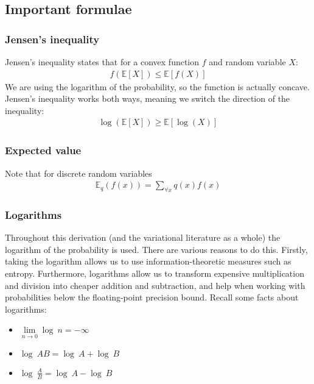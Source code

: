 \subsection{Important formulae}


\subsubsection{Jensen's inequality}
Jensen’s inequality states that for a convex function $f $ and random
variable $X$: 
\begin{align}
f(\mathbb{E}[X]) \leq \mathbb{E}[f(X)] 
\end{align}
We are using the logarithm of the probability, so the function is actually concave. Jensen's inequality works both ways, meaning we switch the direction of the inequality:
    \begin{align}\log(\mathbb{E}[X]) \geq \mathbb{E}[\log(X)] \end{align}

\subsubsection{Expected value}
\label{expectedvalue}
Note that for discrete random variables 
\begin{align} \mathbb{E}_q(f(x)) = \sum\limits_{\forall x} q(x)f(x) \end{align}

\subsubsection{Logarithms}

Throughout this derivation (and the variational literature as a whole) the logarithm of the probability is used. There are various reasons to do this. Firstly, taking the logarithm allows us to use information-theoretic measures such as entropy. Furthermore, logarithms allow us to transform expensive multiplication and division into cheaper addition and subtraction, and help when working with probabilities below the floating-point precision bound. Recall some facts about logarithms:

\begin{itemize}

\item $\lim\limits_{n\rightarrow 0} \log\ n = -\infty $
\item $\log\ AB = \log\ A + \log\ B $
\item $\log\ \frac{A}{B} = \log\ A - \log\ B $
\end{itemize}



